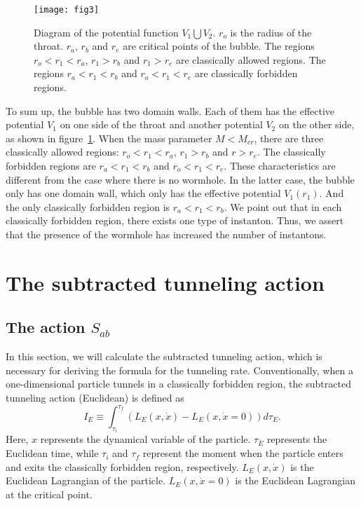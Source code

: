 \documentclass[12pt]{article}
\begin{document}
\begin{figure}[tbp]
\centering
\texttt{[image: fig3]}
\caption{\label{fig:6}Diagram of the potential function $V_{1}\bigcup V_{2}$. $r_{o}$ is the radius of the throat. $r_{a}$, $r_{b}$ and $r_{e}$ are critical points of the bubble. The regions $r_{o}<r_{1}<r_{a}$, $r_{1}>r_{b}$ and $r_{1}>r_{e}$ are classically allowed regions. The regions $r_{a}<r_{1}<r_{b}$ and $r_{o}<r_{1}<r_{e}$ are classically forbidden regions.}
\end{figure}

To sum up, the bubble has two domain walls. Each of them has the effective potential $V_{1}$ on one side of the throat and another potential $V_{2}$ on the other side, as shown in figure~\ref{fig:6}. When the mass parameter $M<M_{cr}$, there are three classically allowed regions: $r_{o}<r_{1}<r_{a}$, $r_{1}>r_{b}$ and $r>r_{e}$. The classically forbidden regions are $r_{a}<r_{1}<r_{b}$ and $r_{o}<r_{1}<r_{e}$.  These characteristics are different from the case where there is no wormhole. In the latter case, the bubble only has one domain wall, which only has the effective potential $V_{1}(r_{1})$. And the only classically forbidden region is $r_{a}<r_{1}<r_{b}$. We point out that in each classically forbidden region, there exists one type of instanton. Thus, we assert that the presence of the wormhole has increased the number of instantons.









\section{The subtracted tunneling action}
\label{sec:3}
\subsection{The action $S_{ab}$}
\label{sec:3.1}
In this section, we will calculate the subtracted tunneling action, which is necessary for deriving the formula for the tunneling rate. Conventionally, when a one-dimensional particle tunnels in a classically forbidden region, the subtracted tunneling action (Euclidean) is defined as~\cite{EAJ}
\begin{equation}
\label{eq:3.1}%
I_{E}\equiv \int_{\tau_{i}}^{\tau_{f}}(L_{E}(x,\dot{x})-L_{E}(x,\dot{x}=0))d\tau_{E}.
\end{equation}
Here, $x$ represents the dynamical variable of the particle. $\tau_{E}$ represents the Euclidean time, while $\tau_{i}$ and $\tau_{f}$ represent the moment when the particle enters and exits the classically forbidden region, respectively. $L_{E}(x,\dot{x})$ is the Euclidean Lagrangian of the particle. $L_{E}(x,\dot{x}=0)$ is the Euclidean Lagrangian at the critical point.
\end{document}
